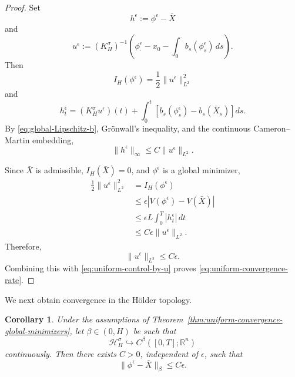 \documentclass[preprint,12pt]{elsarticle}
\newtheorem{corollary}[theorem]{Corollary}
\theoremstyle{definition}
\theoremstyle{plain}
\begin{document}
\begin{proof}
Set
\begin{equation*}
    h^\epsilon:=\phi^\epsilon-\bar X
\end{equation*}
and
\begin{equation*}
    u^\epsilon
    :=
    (K_H^\sigma)^{-1}
    \left(
        \phi^\epsilon_\cdot-x_0
        -
        \int_0^\cdot b_s(\phi^\epsilon_s)\,ds
    \right).
\end{equation*}
Then
\begin{equation*}
    I_H(\phi^\epsilon)
    =
    \frac12\|u^\epsilon\|_{L^2}^2
\end{equation*}
and
\begin{equation}
\label{eq:path-difference-control}
    h^\epsilon_t
    =
    (K_H^\sigma u^\epsilon)(t)
    +
    \int_0^t
    \left[
        b_s(\phi^\epsilon_s)-b_s(\bar X_s)
    \right]ds.
\end{equation}
By \eqref{eq:global-Lipschitz-b}, Gr\"onwall's inequality, and the
continuous Cameron--Martin embedding,
\begin{equation}
\label{eq:uniform-control-by-u}
    \|h^\epsilon\|_\infty
    \leq
    C\|u^\epsilon\|_{L^2}.
\end{equation}

Since $\bar X$ is admissible, $I_H(\bar X)=0$, and
$\phi^\epsilon$ is a global minimizer,
\begin{align*}
    \frac12\|u^\epsilon\|_{L^2}^2
    &=
    I_H(\phi^\epsilon)
    \\
    &\leq
    \epsilon
    |V(\phi^\epsilon)-V(\bar X)|
    \\
    &\leq
    \epsilon L
    \int_0^T|h^\epsilon_t|\,dt
    \\
    &\leq
    C\epsilon\|u^\epsilon\|_{L^2}.
\end{align*}
Therefore,
\begin{equation}
\label{eq:u-epsilon-order}
    \|u^\epsilon\|_{L^2}
    \leq
    C\epsilon.
\end{equation}
Combining this with \eqref{eq:uniform-control-by-u} proves
\eqref{eq:uniform-convergence-rate}.
\end{proof}

We next obtain convergence in the H\"older topology.

\begin{corollary}
\label{cor:Holder-convergence-global-minimizers}
Under the assumptions of
Theorem~\ref{thm:uniform-convergence-global-minimizers}, let
$\beta\in(0,H)$ be such that
\begin{equation*}
    \mathcal H_H^\sigma
    \hookrightarrow
    C^\beta([0,T];\mathbb R^n)
\end{equation*}
continuously. Then there exists $C>0$, independent of $\epsilon$, such
that
\begin{equation}
\label{eq:Holder-convergence-rate}
    \|\phi^\epsilon-\bar X\|_\beta
    \leq
    C\epsilon.
\end{equation}
\end{corollary}
\end{document}

